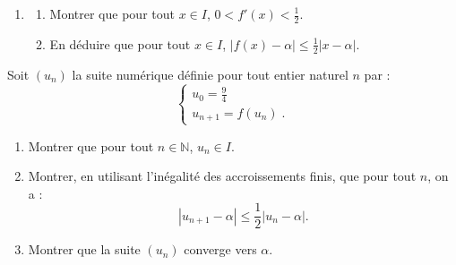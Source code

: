 \begin{exo}
\begin{description}
\begin{enumerate}
\begin{enumerate}
                                          admet une solution unique $\alpha$ dans $I$.
                              \end{enumerate}
                        \item \begin{enumerate}
                                    \item Montrer que pour tout $x \in I$, $ 0 < f'(x) < \frac{1}{2}$.
                                    \item En d\'eduire que pour tout $x \in I$, 
                                          $|f(x) - \alpha | \leq \frac{1}{2} | x- \alpha|$.
                              \end{enumerate}
                  \end{enumerate}
            \item[Partie C :]
                  Soit $(u_n)$ la suite num\'erique d\'efinie pour tout entier naturel $n$ par :       
                  \[
                        \left\lbrace
                              \begin{array}{l}
                                    u_0 = \frac{9}{4}            \\
                                    u_{n+1} = f(u_n)             \;.
                              \end{array}
                        \right.
                  \]
                  \begin{enumerate}
                        \item Montrer que pour tout $n\in\mathbb{N}$, $u_n \in I$.
                        \item Montrer, en utilisant l'in\'egalit\'e des accroissements finis, que pour tout $n$, on a :
                              \[
                                    | u_{n+1} - \alpha | \leq \frac{1}{2} | u_n - \alpha |.
                              \]
                        \item Montrer que la suite $(u_n)$ converge vers $\alpha$.
                  \end{enumerate}
      \end{description}
\end{exo}
%
